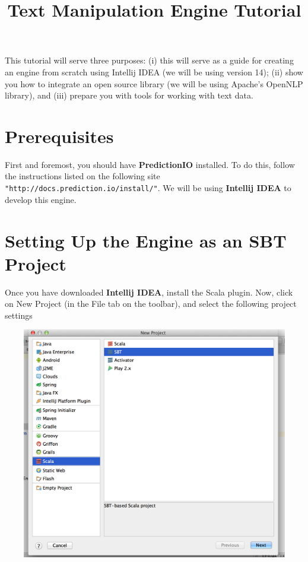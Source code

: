 \documentclass[a4paper,12pt]{article}
\renewcommand{\bf}[1]{\textbf{#1}}
\renewcommand{\tt}[1]{\texttt{#1}}
\newcommand{\3}{\left}
\newcommand{\4}{\right}
\renewcommand{\-}[1]{{}^{-#1}}
\begin{document}
\title{\vspace{-1.5 cm}\bf{Text Manipulation Engine Tutorial}}
\author{\vspace{-1.5cm}}
\date{}
\maketitle

This tutorial will serve three purposes: (i) this will serve as a guide for creating an engine from scratch using Intellij IDEA (we will be using version 14); (ii) show you how to integrate an open source library (we will be using Apache's OpenNLP library), and (iii) prepare you with tools for working with text data.


\section*{Prerequisites}

First and foremost, you should have \bf{PredictionIO} installed. To do this, follow the instructions listed on the following site \tt{"http://docs.prediction.io/install/"}. We will be using \bf{Intellij IDEA} to develop this engine.

\section*{Setting Up the Engine as an SBT Project}

Once you have downloaded \bf{Intellij IDEA}, install the Scala plugin. Now, click on New Project (in the File tab on the toolbar), and select the following project settings

\begin{center}
\vspace{0.6cm}
\includegraphics[width=7in, height=4in, keepaspectratio=true, trim=0em 3em 0em 3em]{img1.png}
\end{center}
\vspace{0.5cm}
\end{document}
